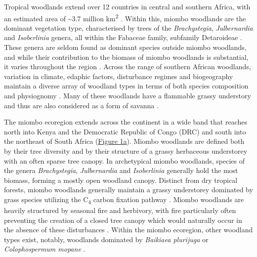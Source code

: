 \begin{refsection}
Tropical woodlands extend over 12 countries in central and southern Africa, with an estimated area of \textasciitilde{}3.7 million km\textsuperscript{2} \citep{White1983, Mayaux2004, Arino2010}. Within this, miombo woodlands are the dominant vegetation type, characterised by trees of the \textit{Brachystegia}, \textit{Julbernardia} and \textit{Isoberlinia} genera, all within the Fabaceae family, subfamily Detaroideae \citep{Chidumayo1997, Campbell2002, Azani2017}. These genera are seldom found as dominant species outside miombo woodlands, and while their contribution to the biomass of miombo woodlands is substantial, it varies throughout the region \citep{Campbell2002}. Across the range of southern African woodlands, variation in climate, edaphic factors, disturbance regimes and biogeography maintain a diverse array of woodland types in terms of both species composition and physiognomy \citep{Privette2004, Caylor2004, Chidumayo2002}. Many of these woodlands have a flammable grassy understory and thus are also considered as a form of savanna \citep{Ratnam2011}.

The miombo ecoregion extends across the continent in a wide band that reaches north into Kenya and the Democratic Republic of Congo (DRC) and south into the northeast of South Africa (\hyperref[plot_map]{Figure 1a}). Miombo woodlands are defined both by their tree diversity and by their structure of a grassy herbaceous understorey with an often sparse tree canopy. In archetypical miombo woodlands, species of the genera \textit{Brachystegia}, \textit{Julbernardia} and \textit{Isoberlinia} generally hold the most biomass, forming a mostly open woodland canopy. Distinct from dry tropical forests, miombo woodlands generally maintain a grassy understorey dominated by grass species utilizing the C\textsubscript{4} carbon fixation pathway \citep{Dexter2015}. Miombo woodlands are heavily structured by seasonal fire and herbivory, with fire particularly often preventing the creation of a closed tree canopy which would naturally occur in the absence of these disturbances \citep{Oliveras2016, Dantas2016}. Within the miombo ecoregion, other woodland types exist, notably, woodlands dominated by \textit{Baikiaea plurijuga} or \textit{Colophospermum mopane} \citep{Campbell2002}.


\end{refsection}
